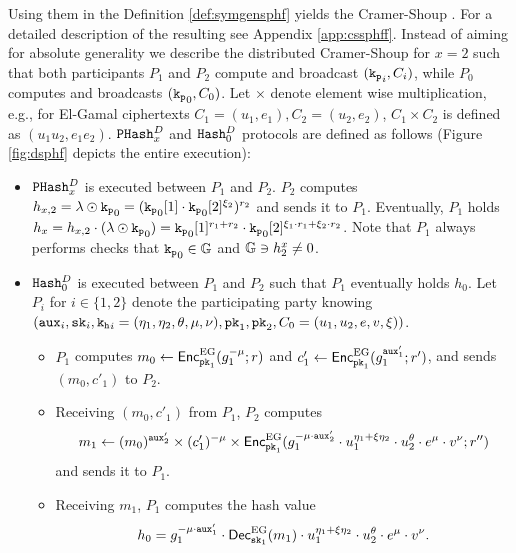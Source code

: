 \noindent
Using them in the \SPHFF Definition \ref{def:symgensphf} yields the Cramer-Shoup \SPHFF.
For a detailed description of the resulting \SPHFF see Appendix \ref{app:cssphff}.
Instead of aiming for absolute generality we describe the distributed Cramer-Shoup \SPHFF for $x=2$ such that both participants $P_1$ and $P_2$ compute and broadcast $(\mathtt{k_p}_i,C_i)$, while $P_0$ computes and broadcasts $(\mathtt{k_p}_0,C_0)$.
Let $\times$ denote element wise multiplication, e.g., for El-Gamal ciphertexts $C_1=(u_1,e_1), C_2=(u_2,e_2)$, $C_1\times C_2$ is defined as $(u_1u_2,e_1e_2)$.
$\mathtt{PHash}_x^D$ and $\mathtt{Hash}_0^D$ protocols are defined as follows (Figure \ref{fig:dsphf} depicts the entire \SPHFF execution):
\begin{itemize}
	\item $\mathtt{PHash}_x^D$ is executed between $P_1$ and $P_2$.
	$P_2$ computes $h_{x,2}=\lambda\odot\mathtt{k_p}_0=(\mathtt{k_p}_0[1]\cdot \mathtt{k_p}_0[2]^{\xi_2})^{r_2}$ and sends it to $P_1$.
	Eventually, $P_1$ holds $h_x=h_{x,2}\cdot (\lambda\odot\mathtt{k_p}_0)=\mathtt{k_p}_0[1]^{r_1+r_2}\cdot \mathtt{k_p}_0[2]^{\xi_1\cdot r_1+\xi_2\cdot r_2}$.
	Note that $P_1$ always performs checks that $\mathtt{k_p}_0\in\mathbb{G}$ and $\mathbb{G}\ni h_2^x\not=0$.
	
	\item $\mathtt{Hash}_0^D$ is executed between $P_1$ and $P_2$ such that $P_1$ eventually holds $h_0$.
	Let $P_i$ for $i\in\{1,2\}$ denote the participating party knowing $(\mathtt{aux}_i,\mathtt{sk}_i,\mathtt{k_h}_i=(\eta_1,\eta_2,\theta,\mu,\nu),\mathtt{pk}_1,\mathtt{pk}_2,C_0=(u_1,u_2,e,v,\xi))$.
	\begin{itemize}
		\item $P_1$ computes $m_0\gets\mathsf{Enc}_{\mathtt{pk}_1}^{\mathrm{EG}}(g_1^{-\mu};r)$ and $c'_1\gets\mathsf{Enc}_{\mathtt{pk}_1}^{\mathrm{EG}}(g_1^{\mathtt{aux}'_1};r')$, and sends $(m_0,c'_1)$ to $P_2$.
	
		\item Receiving $(m_0,c'_1)$ from $P_1$, $P_2$ computes
				$$m_1\gets (m_0)^{\mathtt{aux}'_2}\times (c'_1)^{-\mu}\times \mathsf{Enc}_{\mathtt{pk}_1}^{\mathrm{EG}}(g_{1}^{-\mu\cdot \mathtt{aux}'_2}\cdot u_1^{\eta_1+\xi\eta_2}\cdot u_2^{\theta}\cdot e^{\mu}\cdot v^{\nu};r'')$$
				and sends it to $P_1$.
	
		\item Receiving $m_1$, $P_1$ computes the hash value
				$$h_0=g_1^{-\mu\cdot\mathtt{aux}'_1}\cdot\mathsf{Dec}_{\mathtt{sk}_1}^{\mathrm{EG}}(m_1)\cdot u_1^{\eta_1+\xi\eta_2}\cdot u_2^{\theta}\cdot e^{\mu}\cdot v^{\nu}.$$
	\end{itemize}
\end{itemize}

